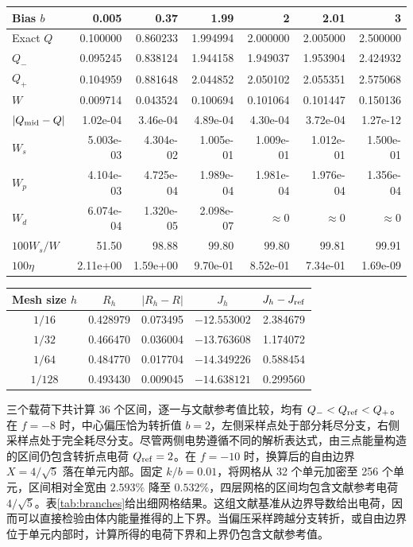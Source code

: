 \begin{tabular}{lrrrrrr}\toprule
Bias $b$ & 0.005 & 0.37 & 1.99 & 2 & 2.01 & 3 \\\midrule
Exact $Q$ & 0.100000 & 0.860233 & 1.994994 & 2.000000 & 2.005000 & 2.500000 \\
$Q_-$ & 0.095245 & 0.838124 & 1.944158 & 1.949037 & 1.953904 & 2.424932 \\
$Q_+$ & 0.104959 & 0.881648 & 2.044852 & 2.050102 & 2.055351 & 2.575068 \\
$W$ & 0.009714 & 0.043524 & 0.100694 & 0.101064 & 0.101447 & 0.150136 \\
$|Q_{\rm mid}-Q|$ & 1.02e-04 & 3.46e-04 & 4.89e-04 & 4.30e-04 & 3.72e-04 & 1.27e-12 \\\midrule
$W_s$ & 5.003e-03 & 4.304e-02 & 1.005e-01 & 1.009e-01 & 1.012e-01 & 1.500e-01 \\
$W_p$ & 4.104e-03 & 4.725e-04 & 1.989e-04 & 1.981e-04 & 1.976e-04 & 1.356e-04 \\
$W_d$ & 6.074e-04 & 1.320e-05 & 2.098e-07 & $\approx0$ & $\approx0$ & $\approx0$ \\
$100W_s/W$ & 51.50 & 98.88 & 99.80 & 99.80 & 99.81 & 99.91 \\
$100\eta$ & 2.11e+00 & 1.59e+00 & 9.70e-01 & 8.52e-01 & 7.34e-01 & 1.69e-09 \\
\bottomrule\end{tabular}

\begin{tabular}{ccccc}\toprule
Mesh size $h$ & $R_h$ & $|R_h-R|$ & $J_h$ & $J_h-J_{\rm ref}$\\\midrule
$1/16$  & 0.428979 & 0.073495 & $-12.553002$ & 2.384679\\
$1/32$  & 0.466470 & 0.036004 & $-13.763608$ & 1.174072\\
$1/64$  & 0.484770 & 0.017704 & $-14.349226$ & 0.588454\\
$1/128$ & 0.493430 & 0.009045 & $-14.638121$ & 0.299560\\
\bottomrule\end{tabular}

三个载荷下共计算 36 个区间，逐一与文献参考值比较，均有 $Q_-<Q_{\rm ref}<Q_+$。在 $f=-8$ 时，中心偏压恰为转折值 $b=2$，左侧采样点处于部分耗尽分支，右侧采样点处于完全耗尽分支。尽管两侧电势遵循不同的解析表达式，由三点能量构造的区间仍包含转折点电荷 $Q_{\rm ref}=2$。在 $f=-10$ 时，换算后的自由边界 $X=4/\sqrt{5}$ 落在单元内部。固定 $k/b=0.01$，将网格从 32 个单元加密至 256 个单元，区间相对全宽由 $2.593\%$ 降至 $0.532\%$，四层网格的区间均包含文献参考电荷 $4/\sqrt{5}$。表\ref{tab:branches}给出细网格结果。这组文献基准从边界导数给出电荷，因而可以直接检验由体内能量推得的上下界。当偏压采样跨越分支转折，或自由边界位于单元内部时，计算所得的电荷下界和上界仍包含文献参考值。

